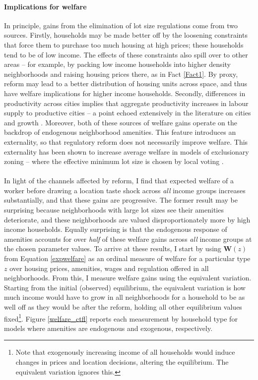 \documentclass[]{article}
\begin{document}
\paragraph*{Implications for welfare} 
In principle, gains from the elimination of lot size regulations come from two sources. Firstly, households may be made better off by the loosening constraints that force them to purchase too much housing at high prices; these households tend to be of low income. The effects of these constraints also spill over to other areas -- for example, by packing low income households into higher density neighborhoods and raising housing prices there, as in Fact \ref{Fact1}. By proxy, reform may lead to a better distribution of housing units across space, and thus have welfare implications for higher income households. Secondly, differences in productivity across cities implies that aggregate productivity increases in labour supply to productive cities -- a point echoed extensively in the literature on cities and growth \citep{durantonpugaurbgrowth} \citep{hseihmoretti}. Moreover, both of these sources of welfare gains operate on the backdrop of endogenous neighborhood amenities. This feature introduces an externality, so that regulatory reform does not necessarily improve welfare. This externality has been shown to increase average welfare in models of exclusionary zoning -- where the effective minimum lot size is chosen by local voting \citep{calabresetal}. 
\paragraph*{}
In light of the channels affected by reform, I find that expected welfare of a worker before drawing a location taste shock across \textit{all} income groups increases substantially, and that these gains are progressive. The former result may be surprising because neighborhoods with large lot sizes see their amenities deteriorate, and these neighborhoods are valued disproportionately more by high income households. Equally surprising is that the endogenous response of amenities accounts for over \textit{half} of these welfare gains across \textit{all} income groups at the chosen parameter values. To arrive at these results, I start by using $\boldsymbol{W}(z)$ from Equation \eqref{expwelfare} as an ordinal measure of welfare for a particular type $z$ over housing prices, amenities, wages and regulation offered in all neighborhoods. From this, I measure welfare gains using the equivalent variation. Starting from the initial (observed) equilibrium, the equivalent variation is how much income would have to grow in all neighborhoods for a household to be as well off as they would be after the reform, holding all other equilibrium values fixed\footnote{Note that exogenously increasing income of all households would induce changes in prices and location decisions, altering the equilibrium. The equivalent variation ignores this.}. Figure \ref{welfare_ctfl} reports each measurement by household type for models where amenities are endogenous and exogenous, respectively.
\end{document}
